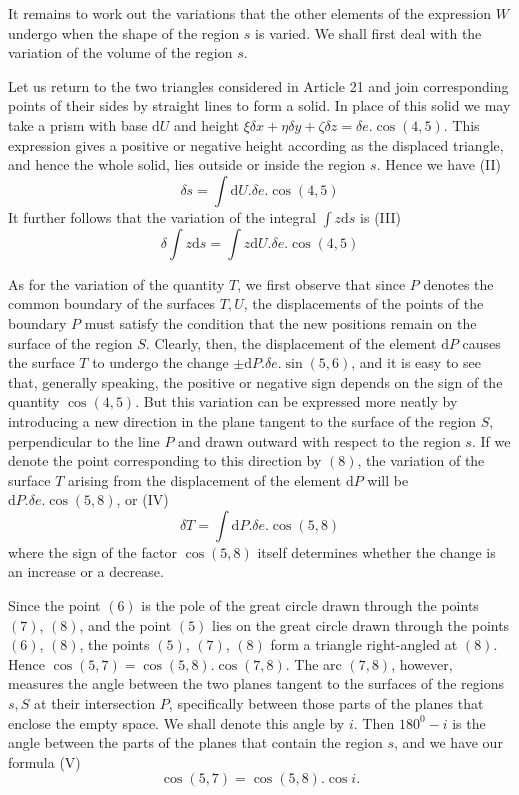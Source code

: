 It remains to work out the variations that the other elements of the expression $W$ undergo when the shape of the region $s$ is varied. We shall first deal with the variation of the volume of the region $s$.

Let us return to the two triangles considered in Article 21 and join corresponding points of their sides by straight lines to form a solid. In place of this solid we may take a prism with base $\mathrm{d}U$ and height $\xi\delta x+\eta\delta y+\zeta\delta z=\delta e.\cos(4,5)$. This expression gives a positive or negative height according as the displaced triangle, and hence the whole solid, lies outside or inside the region $s$. Hence we have (II)
\[
\delta s=\int\mathrm{d}U.\delta e.\cos(4,5)
\]
It further follows that the variation of the integral $\int z\mathrm{d}s$ is (III)
\[
\delta\int z\mathrm{d}s=\int z\mathrm{d}U.\delta e.\cos(4,5)
\]

As for the variation of the quantity $T$, we first observe that since $P$ denotes the common boundary of the surfaces $T,U$, the displacements of the
points of the boundary $P$ must satisfy the condition that the new positions remain on the surface of the region $S$. Clearly, then, the displacement of the element $\mathrm{d}P$ causes the surface $T$ to undergo the change $\pm\mathrm{d}P.\delta e.\sin(5,6)$, and it is easy to see that, generally speaking, the positive or negative sign depends on the sign of the quantity $\cos(4,5)$. But this variation can be expressed more neatly by introducing a new direction in the plane tangent to the surface of the region $S$, perpendicular to the line $P$ and drawn outward with respect to the region $s$. If we denote the point corresponding to this direction by $(8)$, the variation of the surface $T$ arising from the displacement of the element $\mathrm{d}P$ will be $\mathrm{d}P.\delta e.\cos(5,8)$, or (IV)
\[
\delta T=\int\mathrm{d}P.\delta e.\cos(5,8)
\]
where the sign of the factor $\cos(5,8)$ itself determines whether the change is an increase or a decrease.

Since the point $(6)$ is the pole of the great circle drawn through the points $(7)$, $(8)$, and the point $(5)$ lies on the great circle drawn through the points $(6)$, $(8)$, the points $(5)$, $(7)$, $(8)$ form a triangle right-angled at $(8)$. Hence $\cos(5,7)=\cos(5,8).\cos(7,8)$. The arc $(7,8)$, however, measures the angle between the two planes tangent to the surfaces of the regions $s,S$ at their intersection $P$, specifically between those parts of the planes that enclose the empty space. We shall denote this angle by $i$. Then $180^0-i$ is the angle between the parts of the planes that contain the region $s$, and we have our formula (V)
\[
\cos(5,7)=\cos(5,8).\cos i.
\]

